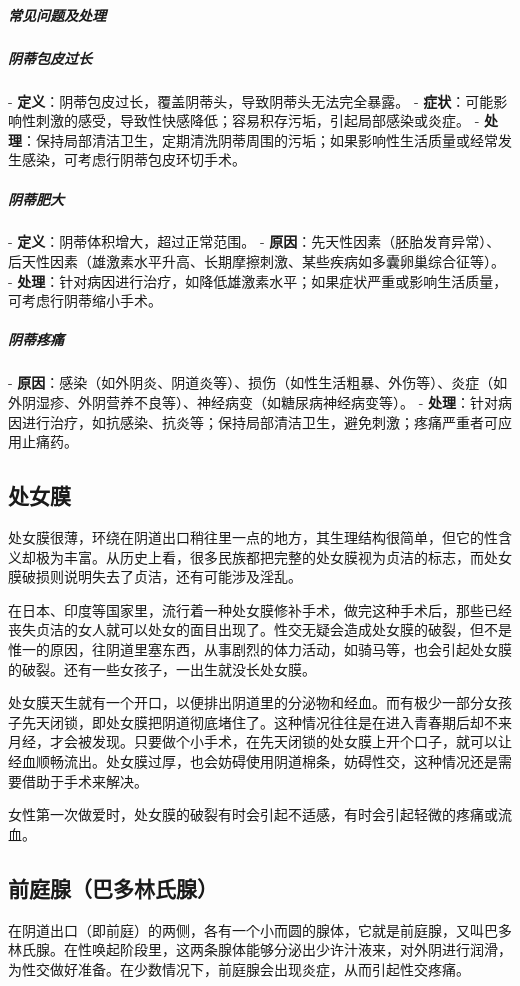 \begin{enumerate}
\subparagraph{常见问题及处理}

\subparagraph{阴蒂包皮过长}
- \textbf{定义}：阴蒂包皮过长，覆盖阴蒂头，导致阴蒂头无法完全暴露。
- \textbf{症状}：可能影响性刺激的感受，导致性快感降低；容易积存污垢，引起局部感染或炎症。
- \textbf{处理}：保持局部清洁卫生，定期清洗阴蒂周围的污垢；如果影响性生活质量或经常发生感染，可考虑行阴蒂包皮环切手术。

\subparagraph{阴蒂肥大}
- \textbf{定义}：阴蒂体积增大，超过正常范围。
- \textbf{原因}：先天性因素（胚胎发育异常）、后天性因素（雄激素水平升高、长期摩擦刺激、某些疾病如多囊卵巢综合征等）。
- \textbf{处理}：针对病因进行治疗，如降低雄激素水平；如果症状严重或影响生活质量，可考虑行阴蒂缩小手术。

\subparagraph{阴蒂疼痛}
- \textbf{原因}：感染（如外阴炎、阴道炎等）、损伤（如性生活粗暴、外伤等）、炎症（如外阴湿疹、外阴营养不良等）、神经病变（如糖尿病神经病变等）。
- \textbf{处理}：针对病因进行治疗，如抗感染、抗炎等；保持局部清洁卫生，避免刺激；疼痛严重者可应用止痛药。

\subsection{处女膜}

处女膜很薄，环绕在阴道出口稍往里一点的地方，其生理结构很简单，但它的性含义却极为丰富。从历史上看，很多民族都把完整的处女膜视为贞洁的标志，而处女膜破损则说明失去了贞洁，还有可能涉及淫乱。

在日本、印度等国家里，流行着一种处女膜修补手术，做完这种手术后，那些已经丧失贞洁的女人就可以处女的面目出现了。性交无疑会造成处女膜的破裂，但不是惟一的原因，往阴道里塞东西，从事剧烈的体力活动，如骑马等，也会引起处女膜的破裂。还有一些女孩子，一出生就没长处女膜。

处女膜天生就有一个开口，以便排出阴道里的分泌物和经血。而有极少一部分女孩子先天闭锁，即处女膜把阴道彻底堵住了。这种情况往往是在进入青春期后却不来月经，才会被发现。只要做个小手术，在先天闭锁的处女膜上开个口子，就可以让经血顺畅流出。处女膜过厚，也会妨碍使用阴道棉条，妨碍性交，这种情况还是需要借助于手术来解决。

女性第一次做爱时，处女膜的破裂有时会引起不适感，有时会引起轻微的疼痛或流血。

\subsection{前庭腺（巴多林氏腺）}

在阴道出口（即前庭）的两侧，各有一个小而圆的腺体，它就是前庭腺，又叫巴多林氏腺。在性唤起阶段里，这两条腺体能够分泌出少许汁液来，对外阴进行润滑，为性交做好准备。在少数情况下，前庭腺会出现炎症，从而引起性交疼痛。


\end{enumerate}
